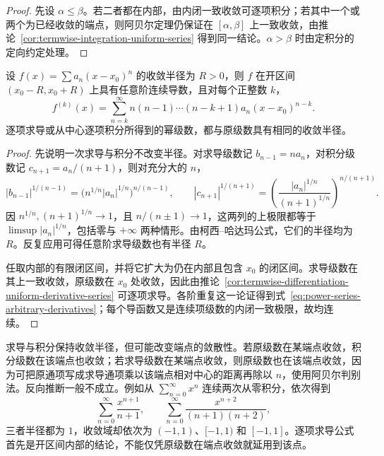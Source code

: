 \begin{proof}
先设 $\alpha\leq\beta$。若二者都在内部，由内闭一致收敛可逐项积分；若其中一个或两个为已经收敛的端点，则阿贝尔定理仍保证在 $[\alpha,\beta]$ 上一致收敛，由推论~\ref{cor:termwise-integration-uniform-series} 得到同一结论。$\alpha>\beta$ 时由定积分的定向约定处理。
\end{proof}

\begin{theorem}[逐项求导及任意阶光滑性]
\label{thm:power-series-termwise-differentiation}
设 $f(x)=\sum a_n(x-x_0)^n$ 的收敛半径为 $R>0$，则 $f$ 在开区间 $(x_0-R,x_0+R)$ 上具有任意阶连续导数，且对每个正整数 $k$，
\begin{equation}
    f^{(k)}(x)=\sum_{n=k}^\infty
        n(n-1)\cdots(n-k+1)a_n(x-x_0)^{n-k}.
    \label{eq:power-series-arbitrary-derivatives}
\end{equation}
逐项求导或从中心逐项积分所得到的幂级数，都与原级数具有相同的收敛半径。
\end{theorem}

\begin{proof}
先说明一次求导与积分不改变半径。对求导级数记 $b_{n-1}=na_n$，对积分级数记 $c_{n+1}=a_n/(n+1)$，则对充分大的 $n$，
\[
    |b_{n-1}|^{1/(n-1)}
        =\bigl(n^{1/n}|a_n|^{1/n}\bigr)^{n/(n-1)},\qquad
    |c_{n+1}|^{1/(n+1)}
        =\left(\frac{|a_n|^{1/n}}{(n+1)^{1/n}}\right)^{n/(n+1)}.
\]
因 $n^{1/n},(n+1)^{1/n}\to1$，且 $n/(n\pm1)\to1$，这两列的上极限都等于 $\limsup|a_n|^{1/n}$，包括零与 $+\infty$ 两种情形。由柯西--哈达玛公式，它们的半径均为 $R$。反复应用可得任意阶求导级数也有半径 $R$。

任取内部的有限闭区间，并将它扩大为仍在内部且包含 $x_0$ 的闭区间。求导级数在其上一致收敛，原级数在 $x_0$ 处收敛，因此由推论~\ref{cor:termwise-differentiation-uniform-derivative-series} 可逐项求导。各阶重复这一论证得到式~\eqref{eq:power-series-arbitrary-derivatives}；每个导函数又是连续项级数的内闭一致极限，故均连续。
\end{proof}

求导与积分保持收敛半径，但可能改变端点的敛散性。若原级数在某端点收敛，积分级数在该端点也收敛；若求导级数在某端点收敛，则原级数也在该端点收敛，因为可把原通项写成求导通项乘以该端点相对中心的距离再除以 $n$，使用阿贝尔判别法。反向推断一般不成立。例如从 $\sum_{n=0}^\infty x^n$ 连续两次从零积分，依次得到
\[
    \sum_{n=0}^\infty\frac{x^{n+1}}{n+1},\qquad
    \sum_{n=0}^\infty\frac{x^{n+2}}{(n+1)(n+2)},
\]
三者半径都为 $1$，收敛域却依次为 $(-1,1)$、$[-1,1)$ 和 $[-1,1]$。逐项求导公式首先是开区间内部的结论，不能仅凭原级数在端点收敛就延用到该点。


